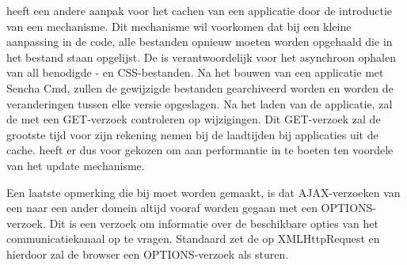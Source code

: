 \st{} heeft een andere aanpak voor het cachen van een applicatie door de introductie van een  mechanisme.
Dit mechanisme wil voorkomen dat bij een kleine aanpassing in de code,  alle bestanden opnieuw moeten worden opgehaald die in het  bestand staan opgelijst.
De  is verantwoordelijk voor het asynchroon ophalen van all benodigde \js{}- en CSS-bestanden.
Na het bouwen van een applicatie met Sencha Cmd,  zullen de gewijzigde bestanden gearchiveerd worden en worden de veranderingen tussen elke versie opgeslagen.
Na het laden van de applicatie, zal de  met een GET-verzoek controleren op wijzigingen.
Dit GET-verzoek zal de grootste tijd voor zijn rekening nemen bij de laadtijden bij applicaties uit de cache.
\st{} heeft er dus voor gekozen om aan performantie in te boeten ten voordele van het update mechanisme.


Een laatste opmerking die bij \st{} moet worden gemaakt, is dat AJAX-verzoeken van een  naar een ander domein altijd vooraf worden gegaan met een OPTIONS-verzoek.
Dit is een verzoek om informatie over de beschikbare opties van het communicatiekanaal op te vragen.
Standaard zet \st{} de  op XMLHttpRequest en hierdoor zal de browser een OPTIONS-verzoek als  sturen.
% 

